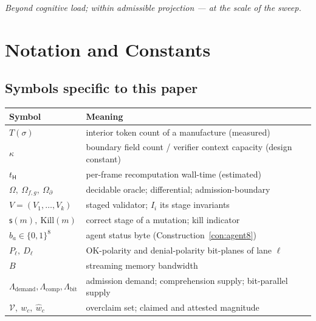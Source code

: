 \documentclass[11pt,oneside]{book}
\theoremstyle{definition}
\theoremstyle{plain}
\theoremstyle{remark}
\newcommand{\chainH}{\mathsf{H}}               %
\newcommand{\CL}{\kappa}                       %
\newcommand{\Over}{\mathcal{V}}                %
\newcommand{\abyte}[1]{{b_{#1}}}                 %
\newcommand{\Bw}{B}                            %
\newcommand{\Kill}{\mathrm{Kill}}
\newcommand{\stg}{\mathsf{s}}                  %
\begin{document}
\begin{center}\itshape Beyond cognitive load; within admissible projection --- at the scale of the sweep.\end{center}

\appendix
\chapter{Notation and Constants}

\section*{Symbols specific to this paper}
\begin{tabular}{ll}
\toprule
Symbol & Meaning\\
\midrule
$T(\sigma)$ & interior token count of a manufacture (measured)\\
$\CL$ & boundary field count / verifier context capacity (design constant)\\
$t_{\chainH}$ & per-frame recomputation wall-time (estimated)\\
$\Omega,\ \Omega_{f,g},\ \Omega_\partial$ & decidable oracle; differential; admission-boundary\\
$V=(V_1,\dots,V_k)$ & staged validator; $I_i$ its stage invariants\\
$\stg(m),\ \Kill(m)$ & correct stage of a mutation; kill indicator\\
$\abyte{a}\in\{0,1\}^8$ & agent status byte (Construction~\ref{con:agent8})\\
$P_\ell,\ D_\ell$ & OK-polarity and denial-polarity bit-planes of lane $\ell$\\
$\Bw$ & streaming memory bandwidth\\
$\Lambda_{\text{demand}},\Lambda_{\text{comp}},\Lambda_{\text{bit}}$ & admission demand; comprehension supply; bit-parallel supply\\
$\Over,\ w_c,\ \widehat w_c$ & overclaim set; claimed and attested magnitude\\
\bottomrule
\end{tabular}
\end{document}
